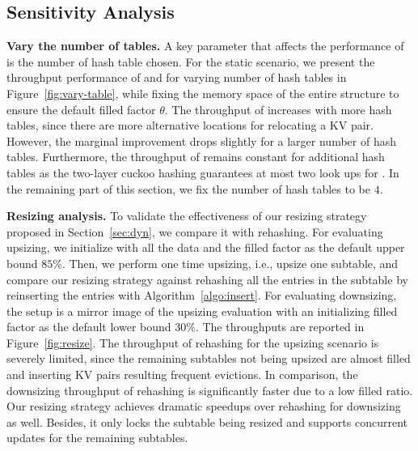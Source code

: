 \subsection{Sensitivity Analysis}\label{sec:exp:tune}

\vspace{1mm}
\noindent\textbf{Vary the number of tables.}
A key parameter that affects the performance of \voter is the number of hash table chosen. For the static scenario, we present the throughput performance of  and  for varying number of hash tables in Figure~\ref{fig:vary-table}, while fixing the memory space of the entire structure to ensure the default filled factor $\theta$. 
The throughput of  increases with more hash tables, since there are more alternative locations for relocating a KV pair. However, the marginal improvement drops slightly for a larger number of hash tables. Furthermore, the throughput of  remains constant for additional hash tables as the two-layer cuckoo hashing guarantees at most two look ups for . In the remaining part of this section, we fix the number of hash tables to be $4$.

\vspace{1mm}
\noindent\textbf{Resizing analysis.}
To validate the effectiveness of our resizing strategy proposed in Section~\ref{sec:dyn}, we compare it with rehashing. 
For evaluating upsizing, we initialize \voter with all the data and the filled factor as the default upper bound $85\%$. Then, we perform one time upsizing, i.e., upsize one subtable, and compare our resizing strategy against rehashing all the entries in the subtable by reinserting the entries with Algorithm~\ref{algo:insert}.
For evaluating downsizing, the setup is a mirror image of the upsizing evaluation with an initializing filled factor as the default lower bound $30\%$. 
The throughputs are reported in Figure~\ref{fig:resize}. 
The throughput of rehashing for the upsizing scenario is severely limited, since the remaining subtables not being upsized are almost filled and inserting KV pairs resulting frequent evictions.  
In comparison, the downsizing throughput of rehashing is significantly faster due to a low filled ratio.
Our resizing strategy achieves dramatic speedups over rehashing for downsizing as well. Besides, it only locks the subtable being resized and supports concurrent updates for the remaining subtables. 

